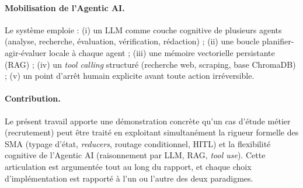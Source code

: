 \paragraph{Mobilisation de l'Agentic AI.} Le système emploie : (i) un LLM comme couche cognitive de plusieurs agents (analyse, recherche, évaluation, vérification, rédaction) ; (ii) une boucle planifier-agir-évaluer locale à chaque agent ; (iii) une mémoire vectorielle persistante (RAG) ; (iv) un \emph{tool calling} structuré (recherche web, scraping, base ChromaDB) ; (v) un point d'arrêt humain explicite avant toute action irréversible.

\paragraph{Contribution.} Le présent travail apporte une démonstration concrète qu'un cas d'étude métier (recrutement) peut être traité en exploitant simultanément la rigueur formelle des SMA (typage d'état, \emph{reducers}, routage conditionnel, HITL) et la flexibilité cognitive de l'Agentic AI (raisonnement par LLM, RAG, \emph{tool use}). Cette articulation est argumentée tout au long du rapport, et chaque choix d'implémentation est rapporté à l'un ou l'autre des deux paradigmes.
